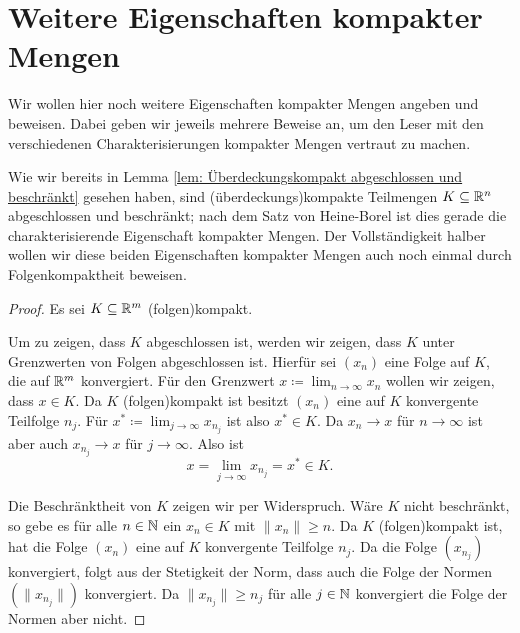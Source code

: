 \documentclass[a4paper,10pt]{article}
\begin{document}
\section{Weitere Eigenschaften kompakter Mengen}
Wir wollen hier noch weitere Eigenschaften kompakter Mengen angeben und beweisen. Dabei geben wir jeweils mehrere Beweise an, um den Leser mit den verschiedenen Charakterisierungen kompakter Mengen vertraut zu machen.


Wie wir bereits in Lemma \ref{lem: Überdeckungskompakt abgeschlossen und beschränkt} gesehen haben, sind (überdeckungs)kompakte Teilmengen $K \subseteq \mathbb{R}^n$ abgeschlossen und beschränkt; nach dem Satz von Heine-Borel ist dies gerade die charakterisierende Eigenschaft kompakter Mengen. Der Vollständigkeit halber wollen wir diese beiden Eigenschaften kompakter Mengen auch noch einmal durch Folgenkompaktheit beweisen.


\begin{proof}
 Es sei $K \subseteq \mathbb{R}^m$ (folgen)kompakt.
 
 Um zu zeigen, dass $K$ abgeschlossen ist, werden wir zeigen, dass $K$ unter Grenzwerten von Folgen abgeschlossen ist. Hierfür sei $(x_n)$ eine Folge auf $K$, die auf $\mathbb{R}^m$ konvergiert. Für den Grenzwert $x \coloneqq \lim_{n \to \infty} x_n$ wollen wir zeigen, dass $x \in K$. Da $K$ (folgen)kompakt ist besitzt $(x_n)$ eine auf $K$ konvergente Teilfolge $n_j$. Für $x^* \coloneqq \lim_{j \to \infty} x_{n_j}$ ist also $x^* \in K$. Da $x_n \to x$ für $n \to \infty$ ist aber auch $x_{n_j} \to x$ für $j \to \infty$. Also ist
 \[
  x = \lim_{j \to \infty} x_{n_j} = x^* \in K.
 \]
 
 Die Beschränktheit von $K$ zeigen wir per Widerspruch. Wäre $K$ nicht beschränkt, so gebe es für alle $n \in \mathbb{N}$ ein $x_n \in K$ mit $\|x_n\| \geq n$. Da $K$ (folgen)kompakt ist, hat die Folge $(x_n)$ eine auf $K$ konvergente Teilfolge $n_j$. Da die Folge $(x_{n_j})$ konvergiert, folgt aus der Stetigkeit der Norm, dass auch die Folge der Normen $(\|x_{n_j}\|)$ konvergiert. Da $\|x_{n_j}\| \geq n_j$ für alle $j \in \mathbb{N}$ konvergiert die Folge der Normen aber nicht.
\end{proof}
\end{document}
